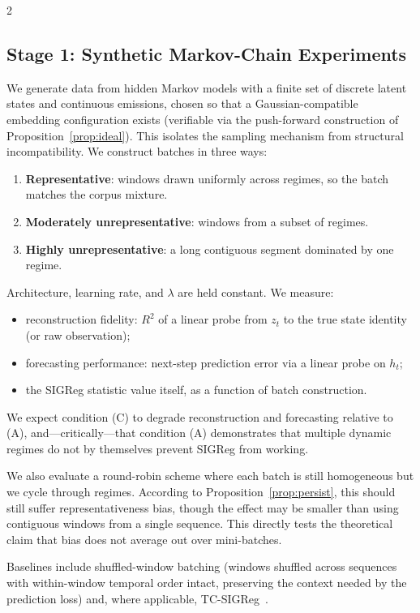 \documentclass[10pt]{article}
\theoremstyle{remark}
\begin{document}
\begin{multicols*}{2}
\subsection{Stage 1: Synthetic Markov-Chain Experiments}

We generate data from hidden Markov models with a finite set of discrete latent states and continuous emissions, chosen so that a Gaussian-compatible embedding configuration exists (verifiable via the push-forward construction of Proposition~\ref{prop:ideal}). This isolates the sampling mechanism from structural incompatibility. We construct batches in three ways:
\begin{enumerate}[leftmargin=*]
    \item \textbf{Representative}: windows drawn uniformly across regimes, so the batch matches the corpus mixture.
    \item \textbf{Moderately unrepresentative}: windows from a subset of regimes.
    \item \textbf{Highly unrepresentative}: a long contiguous segment dominated by one regime.
\end{enumerate}
Architecture, learning rate, and $\lambda$ are held constant. We measure:
\begin{itemize}[leftmargin=*]
    \item reconstruction fidelity: $R^2$ of a linear probe from $z_t$ to the true state identity (or raw observation);
    \item forecasting performance: next-step prediction error via a linear probe on $h_t$;
    \item the SIGReg statistic value itself, as a function of batch construction.
\end{itemize}
We expect condition (C) to degrade reconstruction and forecasting relative to (A), and---critically---that condition (A) demonstrates that multiple dynamic regimes do not by themselves prevent SIGReg from working.

We also evaluate a round-robin scheme where each batch is still homogeneous but we cycle through regimes. According to Proposition~\ref{prop:persist}, this should still suffer representativeness bias, though the effect may be smaller than using contiguous windows from a single sequence. This directly tests the theoretical claim that bias does not average out over mini-batches.

Baselines include shuffled-window batching (windows shuffled across sequences with within-window temporal order intact, preserving the context needed by the prediction loss) and, where applicable, TC-SIGReg~\cite{liu2026tclwm}.


\end{multicols*}
\end{document}
